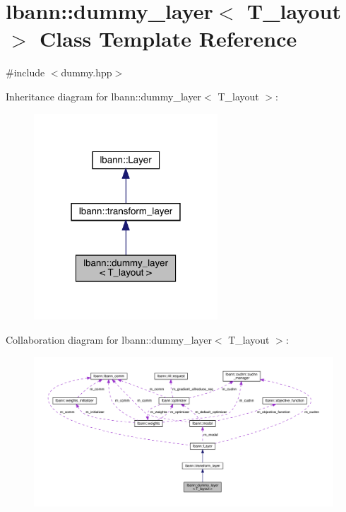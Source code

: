 \hypertarget{classlbann_1_1dummy__layer}{}\section{lbann\+:\+:dummy\+\_\+layer$<$ T\+\_\+layout $>$ Class Template Reference}
\label{classlbann_1_1dummy__layer}


{\ttfamily \#include $<$dummy.\+hpp$>$}



Inheritance diagram for lbann\+:\+:dummy\+\_\+layer$<$ T\+\_\+layout $>$\+:\nopagebreak
\begin{figure}[H]
\begin{center}
\leavevmode
\includegraphics[width=195pt]{classlbann_1_1dummy__layer__inherit__graph}
\end{center}
\end{figure}


Collaboration diagram for lbann\+:\+:dummy\+\_\+layer$<$ T\+\_\+layout $>$\+:\nopagebreak
\begin{figure}[H]
\begin{center}
\leavevmode
\includegraphics[width=350pt]{classlbann_1_1dummy__layer__coll__graph}
\end{center}
\end{figure}
